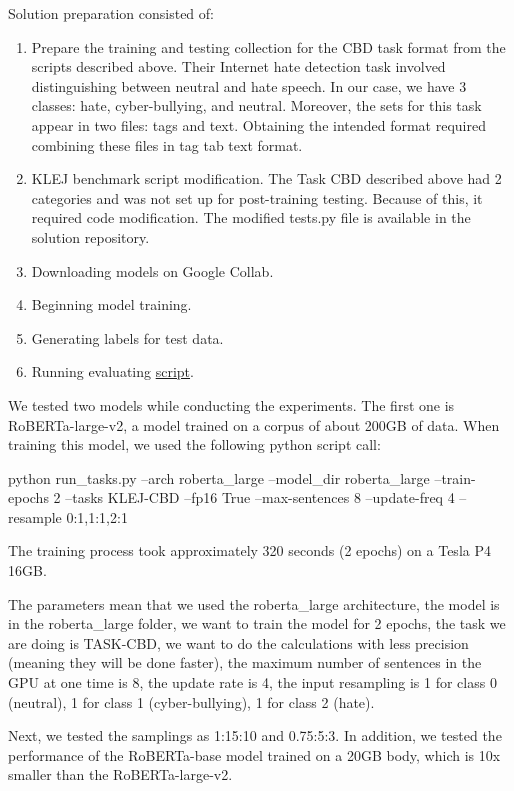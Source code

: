 \documentclass[a4paper]{article}
\begin{document}
Solution preparation consisted of:
\begin{enumerate}
    \item Prepare the training and testing collection for the CBD task format from the scripts described above. Their Internet hate detection task involved distinguishing between neutral and hate speech. In our case, we have 3 classes: hate, cyber-bullying, and neutral. Moreover, the sets for this task appear in two files: tags and text. Obtaining the intended format required combining these files in tag tab text format.
    \item KLEJ benchmark script modification. The Task CBD described above had 2 categories and was not set up for post-training testing. Because of this, it required code modification. The modified tests.py file is available in the solution repository.
    \item Downloading models on Google Collab.
    \item Beginning model training.
    \item Generating labels for test data.
    \item Running evaluating \href{http://2019.poleval.pl/tasks/task6}{script}.
\end{enumerate}

We tested two models while conducting the experiments. The first one is RoBERTa-large-v2, a model trained on a corpus of about 200GB of data. When training this model, we used the following python script call:

python run\_tasks.py --arch roberta\_large --model\_dir roberta\_large --train-epochs 2 --tasks KLEJ-CBD --fp16 True --max-sentences 8 --update-freq 4 --resample 0:1,1:1,2:1

The training process took approximately 320 seconds (2 epochs) on a Tesla P4 16GB.
 
The parameters mean that we used the roberta\_large architecture, the model is in the roberta\_large folder, we want to train the model for 2 epochs, the task we are doing is TASK-CBD, we want to do the calculations with less precision (meaning they will be done faster), the maximum number of sentences in the GPU at one time is 8, the update rate is 4, the input resampling is 1 for class 0 (neutral), 1 for class 1 (cyber-bullying), 1 for class 2 (hate).

Next, we tested the samplings as 1:15:10 and 0.75:5:3. In addition, we tested the performance of the RoBERTa-base model trained on a 20GB body, which is 10x smaller than the RoBERTa-large-v2.
\end{document}
